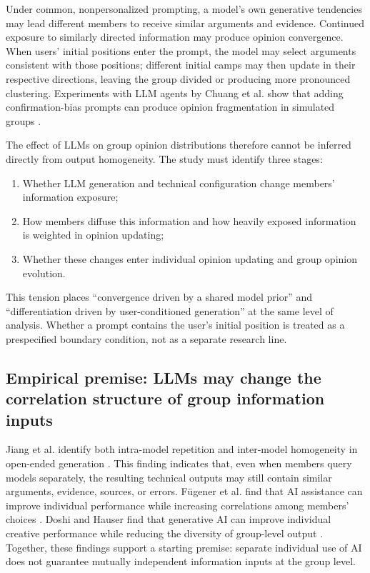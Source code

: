 \documentclass[11pt,a4paper]{article}
\begin{document}
Under common, nonpersonalized prompting, a model's own generative tendencies may lead different members to receive similar arguments and evidence. Continued exposure to similarly directed information may produce opinion convergence. When users' initial positions enter the prompt, the model may select arguments consistent with those positions; different initial camps may then update in their respective directions, leaving the group divided or producing more pronounced clustering. Experiments with LLM agents by Chuang et al. show that adding confirmation-bias prompts can produce opinion fragmentation in simulated groups \cite{chuang2024}.

The effect of LLMs on group opinion distributions therefore cannot be inferred directly from output homogeneity. The study must identify three stages:

\begin{enumerate}
\item Whether LLM generation and technical configuration change members' information exposure;
\item How members diffuse this information and how heavily exposed information is weighted in opinion updating;
\item Whether these changes enter individual opinion updating and group opinion evolution.
\end{enumerate}

This tension places ``convergence driven by a shared model prior'' and ``differentiation driven by user-conditioned generation'' at the same level of analysis. Whether a prompt contains the user's initial position is treated as a prespecified boundary condition, not as a separate research line.

\subsection{Empirical premise: LLMs may change the correlation structure of group information inputs}

Jiang et al. identify both intra-model repetition and inter-model homogeneity in open-ended generation \cite{jiang2025}. This finding indicates that, even when members query models separately, the resulting technical outputs may still contain similar arguments, evidence, sources, or errors. F\"ugener et al. find that AI assistance can improve individual performance while increasing correlations among members' choices \cite{fugener2021}. Doshi and Hauser find that generative AI can improve individual creative performance while reducing the diversity of group-level output \cite{doshi2024}. Together, these findings support a starting premise: separate individual use of AI does not guarantee mutually independent information inputs at the group level.
\end{document}
